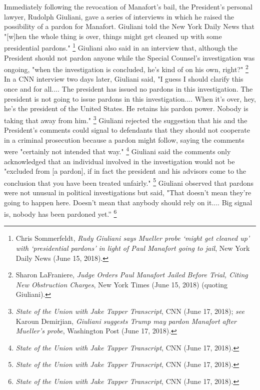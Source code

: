 {Immediately following the revocation of Manafort's bail, the President's personal lawyer, Rudolph Giuliani, gave a series of interviews in which he raised the possibility of a pardon for Manafort.
Giuliani told the New York Daily News that "[w]hen the whole thing is over, things might get cleaned up with some presidential pardons."%
\footnote{Chris Sommerfeldt, \textit{Rudy Giuliani says Mueller probe ‘might get cleaned up’ with ‘presidential pardons’ in light of Paul Manafort going to jail}, New York Daily News (June 15, 2018).}
Giuliani also said in an interview that, although the President should not pardon anyone while the Special Counsel's investigation was ongoing, "when the investigation is concluded, he's kind of on his own, right?"%
\footnote{Sharon LaFraniere, \textit{Judge Orders Paul Manafort Jailed Before Trial, Citing New Obstruction Charges}, New York Times (June 15, 2018) (quoting Giuliani).}
In a CNN interview two days later, Giuliani said, "I guess I should clarify this once and for all....
The president has issued no pardons in this investigation.
The president is not going to issue pardons in this investigation.... When it's over, hey, he's the president of the United States.
He retains his pardon power.
Nobody is taking that away from him."%
\footnote{\textit{State of the Union with Jake Tapper Transcript}, CNN (June 17, 2018);
\textit{see} Karoun Demirjian, \textit{Giuliani suggests Trump may pardon Manafort after Mueller’s probe}, Washington Post (June 17, 2018).}
Giuliani rejected the suggestion that his and the President's comments could signal to defendants that they should not cooperate in a criminal prosecution because a pardon might follow, saying the comments were "certainly not intended that way."%
\footnote{\textit{State of the Union with Jake Tapper Transcript}, CNN (June 17, 2018).}
Giuliani said the comments only acknowledged that an individual involved in the investigation would not be "excluded from [a pardon], if in fact the president and his advisors come to the conclusion that you have been treated unfairly."%
\footnote{\textit{State of the Union with Jake Tapper Transcript}, CNN (June 17, 2018).}
Giuliani observed that pardons were not unusual in political investigations but said, "That doesn't mean they're going to happen here.
Doesn't mean that anybody should rely on it....
Big signal is, nobody has been pardoned yet.''%
\footnote{\textit{State of the Union with Jake Tapper Transcript}, CNN (June 17, 2018).}

}

